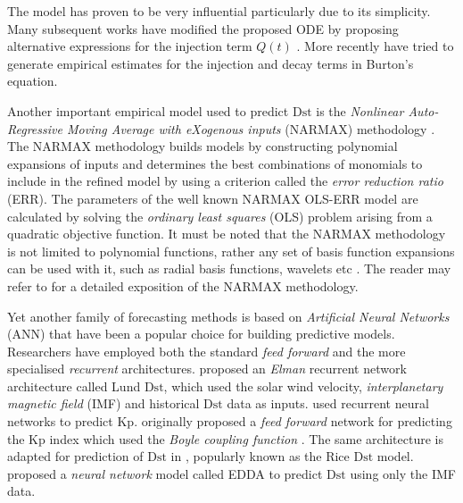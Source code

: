 The \citet{JGR:JGR10260} model has proven to be very influential particularly due to its 
simplicity. Many subsequent works have modified the proposed ODE by proposing alternative 
expressions for the injection term $Q(t)$ \citep{Wang:Dst,JGRA:JGRA14856}. More recently 
\citet{Ballatore2014} have tried to generate empirical estimates for the injection and decay terms 
in Burton's equation.

Another important empirical model used to predict $\mathrm{Dst}$ is the 
\emph{Nonlinear Auto-Regressive Moving Average with eXogenous inputs} (NARMAX) methodology 
\citep{doi:10.1080/00207178908559767,GRL:GRL13494,GRL:GRL20944,JGRA:JGRA18657,balikhin:narmax,JGRA:JGRA20661,JGRA:JGRA50192}. The NARMAX methodology builds models by constructing polynomial expansions of 
inputs and determines the best combinations of monomials to include in the refined model by using a 
criterion called the \emph{error reduction ratio} (ERR). The parameters of the well known NARMAX 
OLS-ERR model are calculated by solving the \emph{ordinary least squares} (OLS) problem arising 
from a quadratic objective function. It must be noted that the NARMAX methodology is not limited to 
polynomial functions, rather any set of basis function expansions can be used with it, such as 
radial basis functions, wavelets etc \citep{doi:10.1080/00207720600903011,JGRA:JGRA17327}. The 
reader may refer to \citet{billings2013nonlinear} for a detailed exposition of the NARMAX 
methodology.

Yet another family of forecasting methods is based on \emph{Artificial Neural Networks} (ANN) that 
have been a popular choice for building predictive models. Researchers have employed both the 
standard \emph{feed forward} and the more specialised \emph{recurrent} architectures. \citet{Lund} 
proposed an \emph{Elman} recurrent network architecture called Lund $\mathrm{Dst}$, which used the 
solar wind velocity, \emph{interplanetary magnetic field} (IMF) and historical $\mathrm{Dst}$ data 
as inputs. \citet{JGRA:JGRA17461} used recurrent neural networks to predict $\mathrm{Kp}$. 
\citet{SWE:SWE286} originally proposed a \emph{feed forward} network for predicting the 
$\mathrm{Kp}$ index which used the \emph{Boyle coupling function} \citep{boyle1997empirical}. The 
same architecture is adapted for prediction of $\mathrm{Dst}$ in \citet{SWE:SWE286}, popularly 
known as the Rice $\mathrm{Dst}$ model. \citet{pallocchia:hal-00318011} proposed a 
\emph{neural network} model called EDDA to predict $\mathrm{Dst}$ using only the IMF data.

